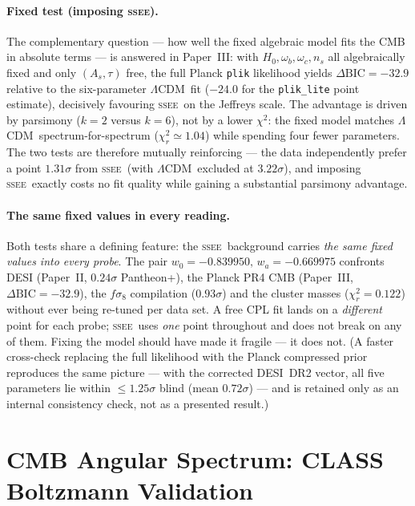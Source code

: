 \documentclass[12pt,a4paper]{article}
\newcommand{\SSEE}{\textsc{ssee}}
\newcommand{\LCDM}{$\Lambda$CDM}
\begin{document}
\paragraph{Fixed test (imposing \SSEE).}
The complementary question --- how well the fixed algebraic model fits the CMB
in absolute terms --- is answered in Paper~III: with $H_0,\omega_b,\omega_c,n_s$
all algebraically fixed and only $(A_s,\tau)$ free, the full Planck
\texttt{plik} likelihood yields $\Delta\mathrm{BIC}=-32.9$ relative to the
six-parameter \LCDM\ fit ($-24.0$ for the \texttt{plik\_lite} point estimate),
decisively favouring \SSEE\ on the Jeffreys scale. The advantage is driven by
parsimony ($k=2$ versus $k=6$), not by a lower $\chi^2$: the fixed model matches
\LCDM\ spectrum-for-spectrum ($\chi^2_r\simeq1.04$) while spending four fewer
parameters. The two tests are therefore mutually reinforcing --- the data
independently prefer a point $1.31\sigma$ from \SSEE\ (with \LCDM\ excluded at
$3.22\sigma$), and imposing \SSEE\ exactly costs no fit quality while gaining
a substantial parsimony advantage.

\paragraph{The same fixed values in every reading.}
Both tests share a defining feature: the \SSEE\ background carries \emph{the
same fixed values into every probe}. The pair $w_0=-0.839950,\,w_a=-0.669975$
confronts DESI (Paper~II, $0.24\sigma$ Pantheon+), the Planck PR4 CMB
(Paper~III, $\Delta\mathrm{BIC}=-32.9$), the $f\sigma_8$ compilation
($0.93\sigma$) and the cluster masses ($\chi^2_r=0.122$) without ever being
re-tuned per data set. A free CPL fit lands on a \emph{different} point for each
probe; \SSEE\ uses \emph{one} point throughout and does not break on any of
them. Fixing the model should have made it fragile --- it does not. (A faster
cross-check replacing the full likelihood with the Planck compressed prior
reproduces the same picture --- with the corrected DESI~DR2 vector, all five
parameters lie within $\le1.25\sigma$ blind (mean $0.72\sigma$) --- and is
retained only as an internal consistency check, not as a presented result.)


\section{CMB Angular Spectrum: CLASS Boltzmann Validation}
\label{sec:cmb}
\end{document}
